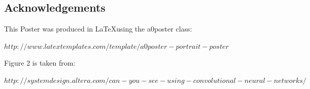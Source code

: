 \documentclass[a0,portrait]{a0poster}
\begin{document}
\begin{multicols}{2}

\section*{Acknowledgements}
This Poster was produced in \LaTeX using the a0poster class:

 \(http://www.latextemplates.com/template/a0poster-portrait-poster\)
 
Figure 2 is taken from:

\(http://systemdesign.altera.com/can-you-see-using-convolutional-neural-networks/\)


\end{multicols}
\end{document}
